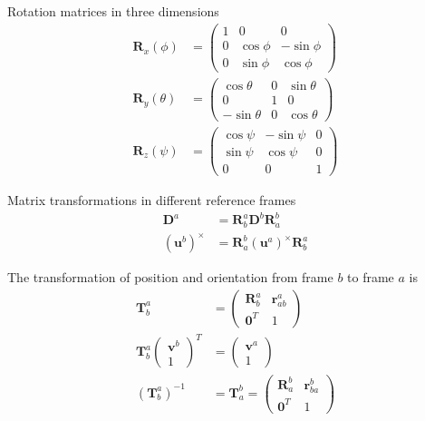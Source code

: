 Rotation matrices in three dimensions
\begin{align*}
    \bm{R}_x(\phi) &= \begin{pmatrix}
        1 & 0 & 0 \\
        0 & \cos \phi & -\sin \phi \\
        0 & \sin \phi & \cos \phi
    \end{pmatrix}\\
    \bm{R}_y(\theta) &= \begin{pmatrix}
        \cos \theta & 0 & \sin \theta \\
        0 & 1 & 0 \\
        -\sin \theta & 0 & \cos \theta
    \end{pmatrix}\\
    \bm{R}_z(\psi) &= \begin{pmatrix}
        \cos \psi & -\sin \psi & 0 \\
        \sin \psi & \cos \psi & 0 \\
        0 & 0 & 1
    \end{pmatrix}
\end{align*}

Matrix transformations in different reference frames
\begin{align*}
    \bm{D}^a &= \bm{R}_b^a\bm{D}^b\bm{R}_a^b \\
    (\bm{u}^b)^\times &= \bm{R}_a^b (\bm{u}^a)^\times \bm{R}_b^a
\end{align*}

The transformation of position and orientation from frame \(\mathit{b}\) to frame \(\mathit{a}\) is
\begin{align*}
    \bm{T}_b^a &= \begin{pmatrix}
        \bm{R}_b^a & \bm{r}_{ab}^a \\
        \bm{0}^T & 1
    \end{pmatrix} \\
    \bm{T}_b^a \begin{pmatrix}\bm{v}^b \\ 1\end{pmatrix}^T &= \begin{pmatrix}\bm{v}^a \\ 1\end{pmatrix}  \\
    (\bm{T}_b^a)^{-1} &= \bm{T}_a^b = \begin{pmatrix}
        \bm{R}_a^b & \bm{r}_{ba}^b \\
        \bm{0}^T & 1
    \end{pmatrix}
\end{align*}

